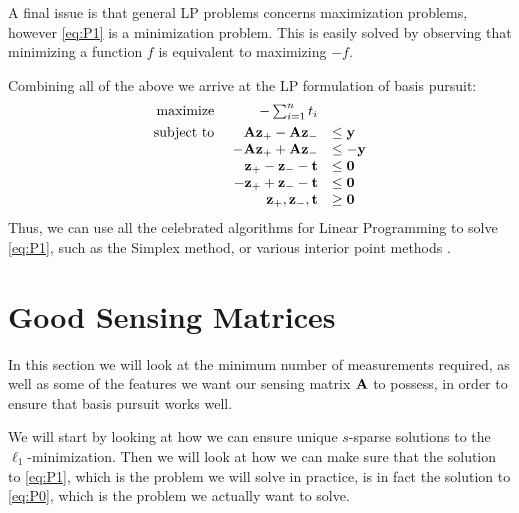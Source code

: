 A final issue is that general LP problems concerns maximization problems, however \eqref{eq:P1} is a minimization problem. This is easily solved by observing that minimizing a function $ f $ is equivalent to maximizing $ -f $.

Combining all of the above we arrive at the LP formulation of basis pursuit:
\begin{equation}
	\begin{array}{r r l l}
		\underset{}{\text{maximize}}~ & -\sum_{i=1}^{n} t_{i}         &          &  \\
		 \quad\operatorname*{subject~to}~ & \mathbf{A}\mathbf{z}_{+} - \mathbf{A}\mathbf{z}_{-}           & \leq \mathbf{y}  &  \\
		            & -\mathbf{A}\mathbf{z}_{+} + \mathbf{A}\mathbf{z}_{-}          & \leq -\mathbf{y} &  \\
		            & \mathbf{z}_{+} - \mathbf{z}_{-} - \mathbf{t}  & \leq \mathbf{0}  &  \\
		            & -\mathbf{z}_{+} + \mathbf{z}_{-} - \mathbf{t} & \leq \mathbf{0}  &  \\
		            & \mathbf{z}_{+}, \mathbf{z}_{-}, \mathbf{t}    & \geq \mathbf{0}   &
	\end{array}
\end{equation}
Thus, we can use all the celebrated algorithms for Linear Programming to solve \eqref{eq:P1}, such as the Simplex method, or various interior point methods \cite{vanderbei14linprog}.










\section{Good Sensing Matrices}
\label{sec:goodmatrices}
In this section we will look at the minimum number of measurements required, as well as some of the features we want our sensing matrix $ \mathbf{A} $ to possess, in order to ensure that basis pursuit works well. 

We will start by looking at how we can ensure unique $ s $-sparse solutions to the $ \ell_{1} $-minimization. Then we will look at how we can make sure that the solution to \eqref{eq:P1}, which is the problem we will solve in practice, is in fact the solution to \eqref{eq:P0}, which is the problem we actually want to solve. 





